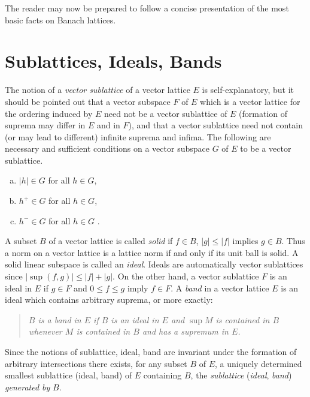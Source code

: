 The reader may now be prepared to follow a concise presentation of the most basic facts on Banach lattices.
\section{Sublattices, Ideals, Bands}\label{sec:c1-1}

The notion of a \emph{vector sublattice} of a vector lattice $ E $ is self-explanatory, but it should be pointed out that a vector subspace $ F $ of $ E $ which is a vector lattice for the ordering induced by $ E $ need not be a vector sublattice of $ E $ (formation of suprema may differ in $ E $ and in $ F $), and that a vector sublattice need not contain (or may lead to different) infinite suprema and infima.
The following are necessary and sufficient conditions on a vector subspace $ G $ of $ E $ to be a vector sublattice.
\begin{enumerate}[(a)]
	\item 
	$ |h| \in G $ for all $ h \in G $, 

	\item 
	$ h^{+} \in G $ for all $ h \in G $, 
	
	\item 
	$ h^{-} \in G $ for all $ h \in G $ .
\end{enumerate}
A subset $ B $ of a vector lattice is called \emph{solid} if $ f \in B $, $ |g| \leq |f| $ implies $ g \in B $.
Thus a norm on a vector lattice is a lattice norm if and only if its unit ball is solid.
A solid linear subspace is called an \emph{ideal}.
Ideals are automatically vector sublattices since $ |\sup(f,g)| \leq |f| + |g| $.
On the other hand, a vector sublattice $ F $ is an ideal in $ E $ if $ g \in F $ and $ 0 \leq f \leq g $ imply $ f \in F $.
A \emph{band} in a vector lattice $ E $ is an ideal which contains arbitrary suprema, or more exactly: 
\begin{quote}
\emph{$ B $ is a band in $ E $ if $ B $ is an ideal in $ E $ and $ \sup M $ is contained in $ B $ whenever $ M $ is contained in $ B $ and has a supremum in $ E $.}
\end{quote}
Since the notions of sublattice, ideal, band are invariant under the formation of arbitrary intersections there exists, for any subset $ B $ of $ E $, a uniquely determined smallest sublattice (ideal, band) of $ E $ containing $ B $, \ie the \emph{sublattice} (\emph{ideal}, \emph{band}) \emph{generated by} $ B $.

